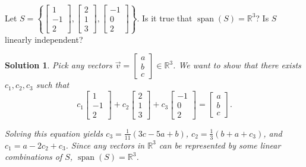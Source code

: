 \documentclass[]{book}
\DeclareMathOperator{\vecspan}{span}
\newtheorem*{solution}{Solution}
\begin{document}
\begin{example}
    Let $S=\left\{\begin{bmatrix}1 \\ -1 \\ 2\end{bmatrix}, \begin{bmatrix}2\\ 1 \\ 3\end{bmatrix}, \begin{bmatrix}-1 \\ 0 \\ 2\end{bmatrix}\right\}$. Is it true that $\vecspan(S)=\mathbb{R}^3$? Is $S$ linearly independent?
\begin{solution}
    Pick any vectors $\vec{v} = \begin{bmatrix}a\\ b \\ c\end{bmatrix} \in \mathbb{R}^3$. We want to show that there exists $c_1,c_2,c_3$ such that 
    \[c_1\begin{bmatrix}1 \\ -1 \\ 2\end{bmatrix} + c_2\begin{bmatrix}2\\ 1 \\ 3\end{bmatrix} + c_3\begin{bmatrix}-1 \\ 0 \\ 2\end{bmatrix} = \begin{bmatrix}a\\ b \\ c\end{bmatrix}.\]
    
    Solving this equation yields $c_3 = \frac{1}{11}(3c-5a+b)$, $c_2 = \frac{1}{3}(b+a+c_3)$, and $c_1 = a - 2c_2 + c_3$. Since any vectors in $\mathbb{R}^3$ can be represented by some linear combinations of $S$, $\vecspan(S) = \mathbb{R}^3$.
    

\end{solution}
\end{example}
\end{document}
